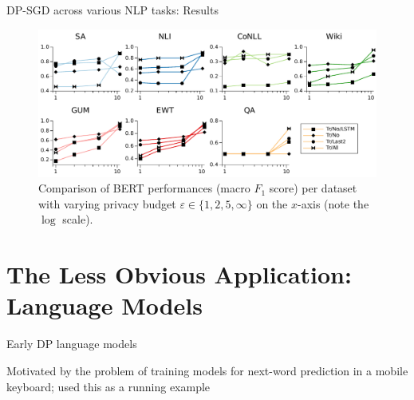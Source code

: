 \documentclass[12pt,aspectratio=169,handout]{beamer}
\begin{document}
\begin{frame}{DP-SGD across various NLP tasks: Results}


\begin{figure}
	\includegraphics[width=\linewidth]{img/plot-fig2.pdf}
	\caption{\label{fig:performance-by-task} Comparison of BERT performances (macro $F_1$ score) per dataset with varying privacy budget $\varepsilon \in \{1, 2, 5, \infty \}$ on the $x$-axis (note the $\log$ scale).}
\end{figure}



\end{frame}



\section{The Less Obvious Application: Language Models}

\begin{frame}{Early DP language models}

Motivated by the problem of training models for next-word prediction in a mobile keyboard; used this as a running example


\end{frame}
\end{document}
